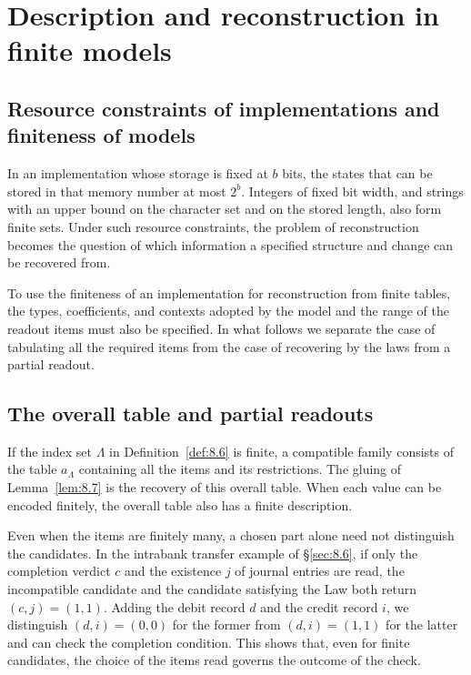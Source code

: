 \section{Description and reconstruction in finite models}\label{sec:8.8}

\subsection*{Resource constraints of implementations and finiteness of models}

In an implementation whose storage is fixed at $b$ bits, the states that can be stored in that
memory number at most $2^b$.
Integers of fixed bit width, and strings with an upper bound on the character set and on the
stored length, also form finite sets.
Under such resource constraints, the problem of reconstruction becomes the question of which
information a specified structure and change can be recovered from.

To use the finiteness of an implementation for reconstruction from finite tables, the types,
coefficients, and contexts adopted by the model and the range of the readout items must also
be specified.
In what follows we separate the case of tabulating all the required items from the case of
recovering by the laws from a partial readout.

\subsection*{The overall table and partial readouts}

If the index set $\Lambda$ in Definition~\ref{def:8.6} is finite, a compatible family consists
of the table $a_\Lambda$ containing all the items and its restrictions.
The gluing of Lemma~\ref{lem:8.7} is the recovery of this overall table.
When each value can be encoded finitely, the overall table also has a finite description.

Even when the items are finitely many, a chosen part alone need not distinguish the
candidates.
In the intrabank transfer example of \S\ref{sec:8.6}, if only the completion verdict $c$ and
the existence $j$ of journal entries are read, the incompatible candidate and the candidate
satisfying the Law both return $(c,j)=(1,1)$.
Adding the debit record $d$ and the credit record $i$, we distinguish $(d,i)=(0,0)$ for the
former from $(d,i)=(1,1)$ for the latter and can check the completion condition.
This shows that, even for finite candidates, the choice of the items read governs the outcome
of the check.

